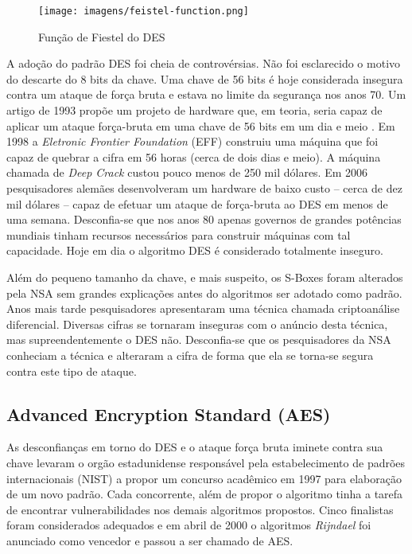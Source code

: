 \begin{figure}[!htp]
  \centering
  \texttt{[image: imagens/feistel-function.png]}
  \caption{Função de Fiestel do DES}
  \label{fig:feistel-function}
\end{figure}


A adoção do padrão DES foi cheia de controvérsias.
Não foi esclarecido o motivo do descarte do 8 bits da chave.
Uma chave de 56 bits é hoje considerada insegura contra um ataque de força bruta e estava no limite da segurança nos anos 70.
Um artigo de 1993 propõe um projeto de hardware que, em teoria, seria capaz de aplicar um ataque força-bruta em uma chave de 56 bits em um dia e meio \cite{}.
Em 1998 a {\em Eletronic Frontier Foundation} (EFF) construiu uma máquina que foi capaz de quebrar a cifra em 56 horas (cerca de dois dias e meio).
A máquina chamada de {\em Deep Crack} custou pouco menos de 250 mil dólares.
Em 2006 pesquisadores alemães desenvolveram um hardware de baixo custo -- cerca de dez mil dólares -- capaz de efetuar um ataque de força-bruta ao DES em menos de uma semana.
Desconfia-se que nos anos 80 apenas governos de grandes potências mundiais tinham recursos necessários para construir máquinas com tal capacidade.
Hoje em dia o algoritmo DES é considerado totalmente inseguro.


Além do pequeno tamanho da chave, e mais suspeito, os S-Boxes foram alterados pela NSA sem grandes explicações antes do algoritmos ser adotado como padrão.
Anos mais tarde pesquisadores apresentaram uma técnica chamada criptoanálise diferencial.
Diversas cifras se tornaram inseguras com o anúncio desta técnica, mas supreendentemente o DES não.
Desconfia-se que os pesquisadores da NSA conheciam a técnica e alteraram a cifra de forma que ela se torna-se segura contra este tipo de ataque.

\subsection{Advanced Encryption Standard (AES)}
\label{sec:aes}

As desconfianças em torno do DES e o ataque força bruta iminete contra sua chave levaram o orgão estadunidense responsável pela estabelecimento de padrões internacionais (NIST) a propor um concurso acadêmico em 1997 para elaboração de um novo padrão.
Cada concorrente, além de propor o algoritmo tinha a tarefa de encontrar vulnerabilidades nos demais algoritmos propostos.
Cinco finalistas foram considerados adequados e em abril de 2000 o algoritmos {\em Rijndael} foi anunciado como vencedor e passou a ser chamado de AES.

